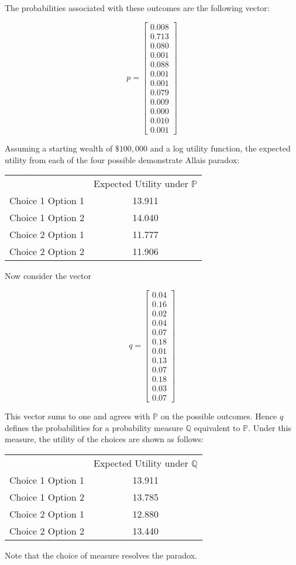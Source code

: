 \documentclass{article}
\begin{document}
The probabilities associated with these outcomes are the following vector:

\[p=\begin{bmatrix}
0.008 \\
0.713 \\
0.080 \\
0.001 \\
0.088 \\
0.001 \\
0.001 \\
0.079 \\
0.009 \\
0.000 \\
0.010 \\
0.001
\end{bmatrix}\]

Assuming a starting wealth of \(\$100,000\) and a log utility function, the expected utility from each of the four possible demonstrate Allais paradox:


\begin{center} 
	\begin{tabular}{c c}
		& Expected Utility under \(\mathbb{P}\) \\
		Choice 1 Option 1 & 13.911 \\
		Choice 1 Option 2 & 14.040 \\
		Choice 2 Option 1 & 11.777 \\
		Choice 2 Option 2 & 11.906 \\
	\end{tabular}
\end{center}

Now consider the vector 

\[q=\begin{bmatrix}
0.04 \\
0.16 \\
0.02 \\
0.04 \\
0.07 \\
0.18 \\
0.01 \\
0.13 \\ 
0.07 \\
0.18 \\
0.03 \\
0.07
\end{bmatrix}\]

This vector sums to one and agrees with \(\mathbb{P}\) on the possible outcomes.  Hence \(q\) defines the probabilities for a probability measure \(\mathbb{Q}\) equivalent to \(\mathbb{P}\).  Under this measure, the utility of the choices are shown as follows:

\begin{center} 
	\begin{tabular}{c c}
		& Expected Utility under \(\mathbb{Q}\) \\
		Choice 1 Option 1 & 13.911 \\
		Choice 1 Option 2 & 13.785 \\
		Choice 2 Option 1 & 12.880 \\
		Choice 2 Option 2 & 13.440 
	\end{tabular}
\end{center}

Note that the choice of measure resolves the paradox.  



	
\end{document}
